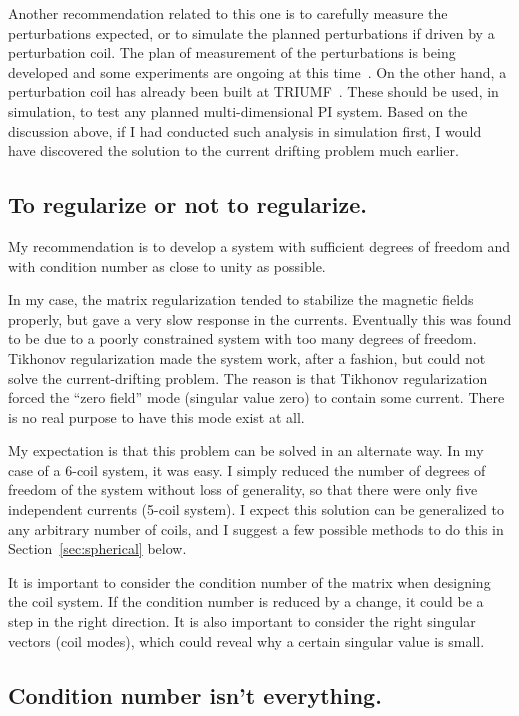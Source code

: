 Another recommendation related to this one is to carefully measure the perturbations expected, or to simulate the planned perturbations if driven by a perturbation coil. The plan of measurement of the perturbations is being developed and some experiments are ongoing at this time~\cite{beapriv}. On the other hand, a perturbation coil has already been built at TRIUMF~\cite{smith,cudmore}. These should be used, in simulation, to test any planned multi-dimensional PI system.  Based on the discussion above, if I had conducted such analysis in simulation first, I would have discovered the solution to the current drifting problem much earlier.


\subsection{To regularize or not to regularize.}
 
My recommendation is to develop a system with sufficient degrees of freedom and with condition number as close to unity as possible. 

In my case, the matrix regularization tended to stabilize the magnetic fields properly, but gave a very slow response in the currents. Eventually this was found to be due to a poorly constrained system with too many degrees of freedom. Tikhonov regularization made the system work, after a fashion, but could not solve the current-drifting problem. The reason is that Tikhonov regularization forced the ``zero field'' mode (singular value zero) to contain some current. There is no real purpose to have this mode exist at all.

My expectation is that this problem can be solved in an alternate way. In my case of a 6-coil system, it was easy. I simply reduced the number of degrees of freedom of the system without loss of generality, so that there were only five independent currents (5-coil system). I expect this solution can be generalized to any arbitrary number of coils, and I suggest a few possible methods to do this in Section~\ref{sec:spherical} below.

It is important to consider the condition number of the matrix when designing the coil system.  If the condition number is reduced by a change, it could be a step in the right direction.  It is also important to consider the right singular vectors (coil modes), which could reveal why a certain singular value is small.


\subsection{Condition number isn't everything.}

